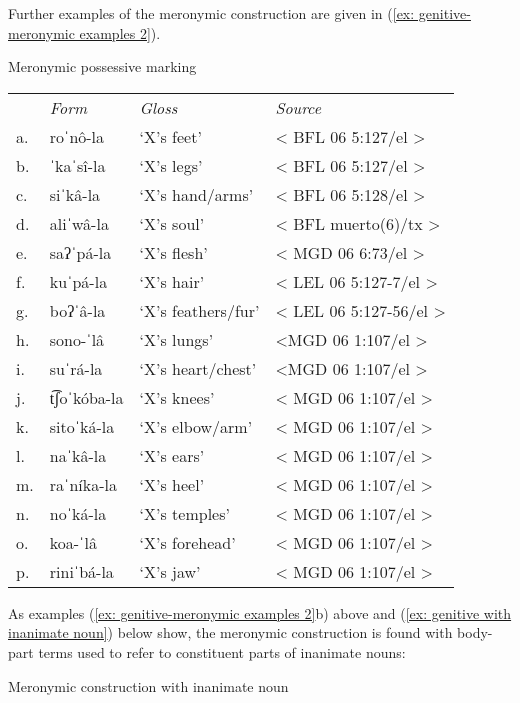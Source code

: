 Further examples of the meronymic construction are given in (\ref{ex: genitive-meronymic examples 2}).


\ea\label{ex: genitive-meronymic examples 2}
{Meronymic possessive marking}\\

\begin{tabular}{llll}
        & \textit{Form} &  \textit{Gloss} & \textit{Source}\\
     a.& roˈnô-la &  `X's feet' & < BFL 06 5:127/el >\\
     b.& ˈkaˈsî-la  & `X's legs' & < BFL 06 5:127/el >\\
     c.& siˈkâ-la &  `X's hand/arms' & < BFL 06 5:128/el >\\
     d.& aliˈwâ-la & `X's soul' & < BFL muerto(6)/tx >\\
     e.& saʔˈpá-la & ‘X’s flesh’ & < MGD 06 6:73/el >\\
     f.& kuˈpá-la & ‘X’s hair’ & < LEL 06 5:127-7/el >\\
     g.& boʔˈâ-la & ‘X’s feathers/fur’ & < LEL 06 5:127-56/el >\\
     h.& sono-ˈlâ & ‘X’s lungs’ &  <MGD 06 1:107/el >\\
     i.& suˈrá-la & ‘X’s heart/chest’ & <MGD 06 1:107/el >\\
     j.& t͡ʃoˈkóba-la & ‘X’s knees’ & < MGD 06 1:107/el >\\
     k.& sitoˈká-la & ‘X’s elbow/arm’ & < MGD 06 1:107/el >\\
     l.& naˈkâ-la & ‘X’s ears’ & < MGD 06 1:107/el >\\
     m.& raˈníka-la & ‘X’s heel’ & < MGD 06 1:107/el >\\
     n.& noˈká-la & ‘X’s temples’ & < MGD 06 1:107/el >\\
     o.& koa-ˈlâ & ‘X’s forehead’ & < MGD 06 1:107/el >\\
     p.& riniˈbá-la & ‘X’s jaw' & < MGD 06 1:107/el >\\
\end{tabular}
    \z

As examples (\ref{ex: genitive-meronymic examples 2}b) above and (\ref{ex: genitive with inanimate noun}) below show, the meronymic construction is found with body-part terms used to refer to constituent parts of inanimate nouns:


\ea\label{ex: genitive with inanimate noun}
{Meronymic construction with inanimate noun}\\

